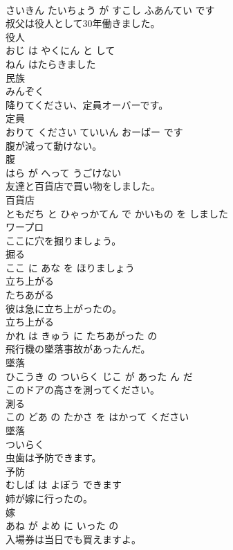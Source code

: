 \documentclass[8pt]{extreport}
\begin{document}
\begin{CJK}{UTF8}{min}
\\	さいきん たいちょう が すこし ふあんてい です			
\\	叔父は役人として30年働きました。	
\\	役人 
\\	おじ は やくにん と して 
\\	ねん はたらきました			
\\	民族	
\\	みんぞく		
\\	降りてください、定員オーバーです。	
\\	定員 
\\	おりて ください ていいん おーばー です			
\\	腹が減って動けない。	
\\	腹 
\\	はら が へって うごけない			
\\	友達と百貨店で買い物をしました。	
\\	百貨店 
\\	ともだち と ひゃっかてん で かいもの を しました			
\\	ワープロ	
\\	ここに穴を掘りましょう。	
\\	掘る 
\\	ここ に あな を ほりましょう			
\\	立ち上がる	
\\	たちあがる		
\\	彼は急に立ち上がったの。	
\\	立ち上がる 
\\	かれ は きゅう に たちあがった の			
\\	飛行機の墜落事故があったんだ。	
\\	墜落 
\\	ひこうき の ついらく じこ が あった ん だ			
\\	このドアの高さを測ってください。	
\\	測る 
\\	この どあ の たかさ を はかって ください			
\\	墜落	
\\	ついらく		
\\	虫歯は予防できます。	
\\	予防 
\\	むしば は よぼう できます			
\\	姉が嫁に行ったの。	
\\	嫁 
\\	あね が よめ に いった の			
\\	入場券は当日でも買えますよ。	

\end{CJK}
\end{document}
